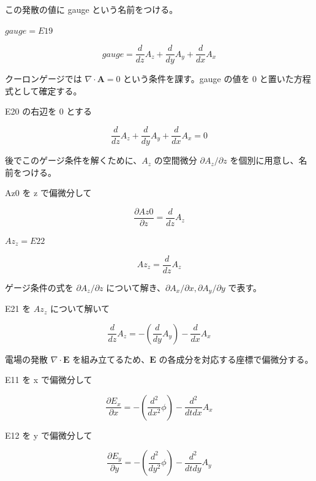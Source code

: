\documentclass[dvipdfmx,a4paper,11pt]{jsarticle}
\begin{document}
この発散の値に gauge という名前をつける。

$gauge = E19$

\begin{equation}
  gauge = \frac{d}{d z} A_{z}+\frac{d}{d y} A_{y}+\frac{d}{d x} A_{x}
  \label{eq:E20}
\end{equation}

クーロンゲージでは $\nabla\cdot\mathbf A=0$ という条件を課す。gauge の値を 0 と置いた方程式として確定する。

E20 の右辺を 0 とする

\begin{equation}
  \frac{d}{d z} A_{z}+\frac{d}{d y} A_{y}+\frac{d}{d x} A_{x} = 0
  \label{eq:E21}
\end{equation}

後でこのゲージ条件を解くために、$A_z$ の空間微分 $\partial A_z/\partial z$ を個別に用意し、名前をつける。

Az0 を z で偏微分して

\begin{equation}
  \frac{\partial Az0}{\partial z} = \frac{d}{d z} A_{z}
  \label{eq:E22}
\end{equation}

$Az_z = E22$

\begin{equation}
  Az_z = \frac{d}{d z} A_{z}
  \label{eq:E23}
\end{equation}

ゲージ条件の式を $\partial A_z/\partial z$ について解き、$\partial A_x/\partial x,\partial A_y/\partial y$ で表す。

E21 を $Az_z$ について解いて

\begin{equation}
  \frac{d}{d z} A_{z} = -\left(\frac{d}{d y} A_{y}\right)-\frac{d}{d x} A_{x}
  \label{eq:E24}
\end{equation}

電場の発散 $\nabla\cdot\mathbf E$ を組み立てるため、$\mathbf E$ の各成分を対応する座標で偏微分する。

E11 を x で偏微分して

\begin{equation}
  \frac{\partial E_x}{\partial x} = -\left(\frac{d^2}{d x^2} \phi\right)-\frac{d^2}{d t d x} A_{x}
  \label{eq:E25}
\end{equation}

E12 を y で偏微分して

\begin{equation}
  \frac{\partial E_y}{\partial y} = -\left(\frac{d^2}{d y^2} \phi\right)-\frac{d^2}{d t d y} A_{y}
  \label{eq:E26}
\end{equation}
\end{document}
